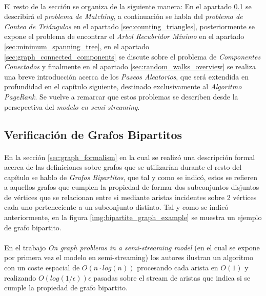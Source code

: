 \documentclass{subfiles}
\begin{document}
      \paragraph{}
      El resto de la sección se organiza de la siguiente manera: En el apartado \ref{sec:bipartite_matchings} se describirá el \emph{problema de Matching}, a continuación se habla del \emph{problema de Conteo de Triángulos} en el apartado \ref{sec:counting_triangles}, posteriormente se expone el problema de encontrar el \emph{Arbol Recubridor Mínimo} en el apartado \ref{sec:minimum_spanning_tree}, en el apartado \ref{sec:graph_connected_components} se discute sobre el problema de \emph{Componentes Conectados} y finalmente en el apartado \ref{sec:random_walks_overview} se realiza una breve introducción acerca de los \emph{Paseos Aleatorios}, que será extendida en profundidad en el capítulo siguiente, destinado exclusivamente al \emph{Algoritmo PageRank}. Se vuelve a remarcar que estos problemas se describen desde la persepectiva del \emph{modelo en semi-streaming}.

      \subsection{Verificación de Grafos Bipartitos}
      \label{sec:bipartite_matchings}

        \paragraph{}
        En la sección \ref{sec:graph_formalism} en la cual se realizó una descripción formal acerca de las definiciones sobre grafos que se utilizarían durante el resto del capítulo se hablo de \emph{Grafos Bipartitos}, que tal y como se indicó, estos se refieren a aquellos grafos que cumplen la propiedad de formar dos subconjuntos disjuntos de vértices que se relacionan entre si mediante aristas incidentes sobre 2 vértices cada uno perteneciente a un subconjunto distinto. Tal y como se indicó anteriormente, en la figura \ref{img:bipartite_graph_example} se muestra un ejemplo de grafo bipartito.

        \paragraph{}
        En el trabajo \emph{On graph problems in a semi-streaming model}\cite{feigenbaum2005graph} (en el cual se expone por primera vez el modelo en semi-streaming) los autores ilustran un algoritmo con un coste espacial de $O(n \cdot log(n))$ procesando cada arista en $O(1)$ y realizando $O(log(1 / \epsilon)) \epsilon$ pasadas sobre el stream de aristas que indica si se cumple la propiedad de grafo bipartito.
\end{document}
